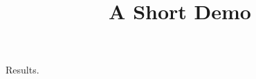 \documentclass[article]{jss}
\title{A Short Demo}
\begin{document}
\begin{table}
Results.
\caption{\label{tab:ov} Overview of the regression models.}
\end{table}
\end{document}
